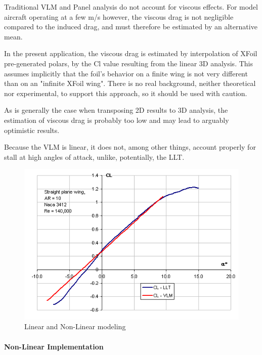 \documentclass[a4paper,twoside,12pt,dvips]{article}
\begin{document}
Traditional VLM and Panel analysis do not account for viscous effects.
For model aircraft operating at a few m/s however, the viscous drag is
not negligible compared to the induced drag, and must therefore be
estimated by an alternative mean.

In the present application, the viscous drag is estimated by
interpolation of XFoil pre-generated polars, by the Cl value resulting
from the linear 3D analysis. This assumes implicitly that the foil's
behavior on a finite wing is not very different than on an "infinite
XFoil wing". There is no real background, neither theoretical nor
experimental, to support this approach, so it should be used with
caution.

As is generally the case when transposing 2D results to 3D analysis,
the estimation of viscous drag is probably too low and may lead to
arguably optimistic results.

Because the VLM is linear, it does not, among other things, account
properly for stall at high angles of attack, unlike, potentially, the
LLT.

\begin{figure}[htbp]
  \includegraphics[width=0.8\linewidth]{img-28}\centering 
  \caption{Linear and Non-Linear modeling}
  \label{fig:linear_and_non_linear_modeling}
\end{figure}


\paragraph{Non-Linear Implementation}
\end{document}
